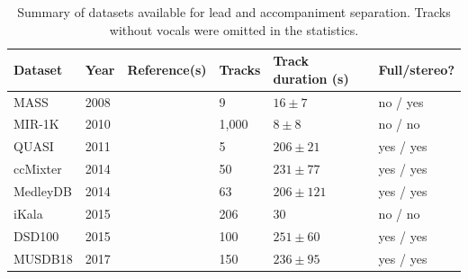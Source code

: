 \begin{table}[htbp]
	\centering
	\caption{Summary of datasets available for lead and accompaniment separation. Tracks without vocals were omitted in the statistics.}
	\label{tab:datasets}
		\begin{tabular}{l l l l l l}
			\hline
			\textbf{Dataset} & \textbf{Year} & \textbf{Reference(s)} & \textbf{Tracks} & \textbf{Track duration (s)} & \textbf{Full/stereo?}\\
			\hline
			MASS & 2008 & \cite{MTGMASSdb} & 9 & $16 \pm 7$ & no / yes \\
			MIR-1K & 2010 & \cite{hsu10} & 1,000 & $8 \pm 8$ & no / no \\
			QUASI & 2011 & \cite{liutkus11,vincent12} & 5 & $206 \pm 21$ & yes / yes \\
			ccMixter & 2014 & \cite{liutkus142} & 50 & $231 \pm 77 $ & yes / yes \\
			MedleyDB & 2014 & \cite{bittner14} & 63 & $206 \pm 121$ & yes / yes \\
			iKala & 2015 & \cite{chan15} & 206 & 30 & no / no \\
			DSD100 & 2015 & \cite{ono15} & 100 & $251 \pm 60$ & yes / yes \\
      MUSDB18 & 2017 & \cite{rafii17} & 150 & $236 \pm 95$ & yes / yes \\
			\hline
		\end{tabular}
\end{table}














